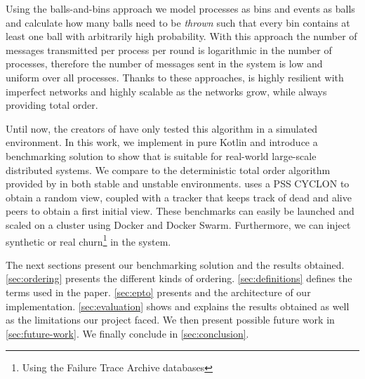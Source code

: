 \par
Using the balls-and-bins approach we model processes as bins and events as balls and calculate how many balls need to be \textit{thrown} such that every bin contains at least one ball with arbitrarily high probability. With this approach the number of messages transmitted per process per round is logarithmic in the number of processes, therefore the number of messages sent in the system is low and uniform over all processes. Thanks to these approaches, \epto is highly resilient with  imperfect networks and highly scalable as the networks grow, while always providing total order. \par
Until now, the creators of \epto have only tested this algorithm in a simulated environment. In this work, we implement \epto in pure Kotlin and introduce a benchmarking solution to show that \epto is suitable for real-world large-scale distributed systems. We compare \epto to the deterministic total order algorithm provided by \jgroups \autocite{jgroups} in both stable and unstable environments. \epto uses a PSS CYCLON \autocite{Voulgaris2005} to obtain a random view, coupled with a tracker that keeps track of dead and alive peers to obtain a first initial view. These benchmarks can easily be launched and scaled on a cluster using Docker and Docker Swarm. Furthermore, we can inject synthetic or real churn\footnote{Using the Failure Trace Archive databases} in the system.
\par
The next sections present our benchmarking solution and the results obtained. \autoref{sec:ordering} presents the different kinds of ordering. \autoref{sec:definitions} defines the terms used in the paper. \autoref{sec:epto} presents \epto and the architecture of our implementation. \autoref{sec:evaluation} shows and explains the results obtained as well as the limitations our project faced. We then present possible future work in \autoref{sec:future-work}. We finally conclude in \autoref{sec:conclusion}. 
